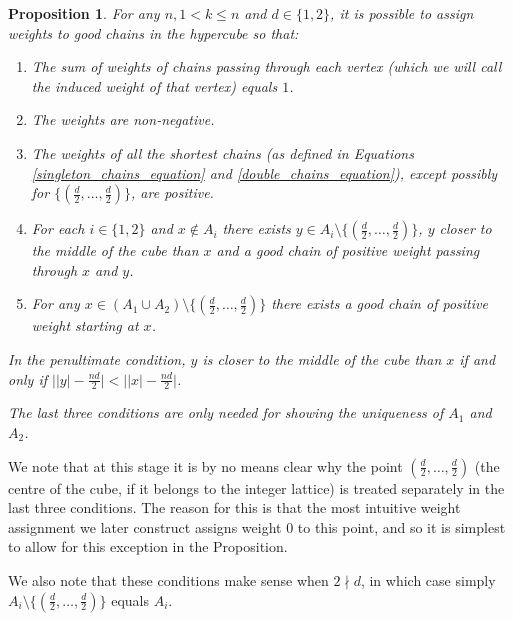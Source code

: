\documentclass[11pt, reqno]{amsart}
\newcommand{\leanblueprintbase}{https://mj141592.github.io/weighted-chains-paper}
\newif\ifleanlinks
\newcommand{\leanblueprint}[1]{%
  \ifleanlinks
    \leavevmode\unskip\penalty9999\hbox{}\nobreak\hfill\quad
    \href{\leanblueprintbase/theorems/#1/}{%
      \mbox{\normalfont\footnotesize\textcolor{blue}{[\textsf{Lean formalisation}]}}}%
    \par\nobreak
  \fi
}
\newtheorem{proposition}[theorem]{Proposition}
\theoremstyle{remark}
\numberwithin{equation}{section}
\newcommand{\thespecialpoint}{(\frac{d}{2}, \ldots, \frac{d}{2})}
\begin{document}
\begin{proposition}
\label{wc:prop:good-chain-weighting}
\label{the_weights_assigning_proposition}
    For any $n, 1 < k \leqslant n$ and $d \in \{1, 2\}$, it is possible to assign weights to good chains in the hypercube so that:
    \begin{enumerate}
        \item \label{sum_1_condition} The sum of weights of chains passing through each vertex (which we will call the induced weight of that vertex) equals $1$.
        
        \item \label{non_negative_condition} The weights are non-negative.

        \item \label{short_chains_positive_condition} The weights of all the shortest chains (as defined in Equations \ref{singleton_chains_equation} and \ref{double_chains_equation}), except possibly for $\{\thespecialpoint\}$, are positive.
        
        \item \label{positive_non_A_condition} For each $i \in \{1, 2\}$ and $x \notin A_i$ there exists $y \in A_i \setminus \{\thespecialpoint\}$, $y$ closer to the middle of the cube than $x$ and a good chain of positive weight passing through $x$ and $y$. 
        
        \item \label{positive_A_condition} For any $x \in (A_1 \cup A_2) \setminus \{\thespecialpoint\}$ there exists a good chain of positive weight starting at $x$.
    \end{enumerate}
    In the penultimate condition, $y$ is closer to the middle of the cube than $x$ if and only if $\vert |y| - \frac{nd}{2} \vert < \vert |x| - \frac{nd}{2} \vert$.
    
    The last three conditions are only needed for showing the uniqueness of $A_1$ and $A_2$.
\leanblueprint{good-chain-weighting}
\end{proposition}

We note that at this stage it is by no means clear why the point $\thespecialpoint$ (the centre of the cube, if it belongs to the integer lattice) is treated separately in the last three conditions. The reason for this is that the most intuitive weight assignment we later construct assigns weight $0$ to this point, and so it is simplest to allow for this exception in the Proposition.

We also note that these conditions make sense when $2 \nmid d$, in which case simply $A_i \setminus \{\thespecialpoint\}$ equals $A_i$.
\end{document}
